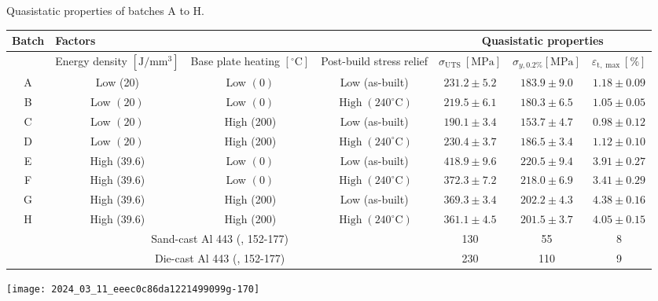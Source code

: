 \documentclass[10pt]{article}
\begin{document}
Quasistatic properties of batches A to H.

\begin{center}
\begin{tabular}{|c|c|c|c|c|c|c|}
\hline
\multirow[t]{2}{*}{Batch} & \multicolumn{3}{|l|}{Factors} & \multicolumn{3}{|c|}{Quasistatic properties} \\
\hline
 & Energy density $\left[\mathrm{J} / \mathrm{mm}^{3}\right]$ & Base plate heating $\left[{ }^{\circ} \mathrm{C}\right]$ & Post-build stress relief & $\sigma_{\text {UTS }}[\mathrm{MPa}]$ & $\sigma_{y, 0.2 \%}[\mathrm{MPa}]$ & $\varepsilon_{\mathrm{t}, \max }[\%]$ \\
\hline
A & Low (20) & Low $(0)$ & Low (as-built) & $231.2 \pm 5.2$ & $183.9 \pm 9.0$ & $1.18 \pm 0.09$ \\
\hline
B & Low $(20)$ & Low $(0)$ & $\operatorname{High}\left(240^{\circ} \mathrm{C}\right)$ & $219.5 \pm 6.1$ & $180.3 \pm 6.5$ & $1.05 \pm 0.05$ \\
\hline
C & Low $(20)$ & High (200) & Low (as-built) & $190.1 \pm 3.4$ & $153.7 \pm 4.7$ & $0.98 \pm 0.12$ \\
\hline
D & Low $(20)$ & High (200) & $\operatorname{High}\left(240^{\circ} \mathrm{C}\right)$ & $230.4 \pm 3.7$ & $186.5 \pm 3.4$ & $1.12 \pm 0.10$ \\
\hline
E & High (39.6) & Low $(0)$ & Low (as-built) & $418.9 \pm 9.6$ & $220.5 \pm 9.4$ & $3.91 \pm 0.27$ \\
\hline
F & High (39.6) & Low $(0)$ & $\operatorname{High}\left(240^{\circ} \mathrm{C}\right)$ & $372.3 \pm 7.2$ & $218.0 \pm 6.9$ & $3.41 \pm 0.29$ \\
\hline
G & High (39.6) & High (200) & Low (as-built) & $369.3 \pm 3.4$ & $202.2 \pm 4.3$ & $4.38 \pm 0.16$ \\
\hline
$\mathrm{H}$ & High (39.6) & High (200) & $\operatorname{High}\left(240^{\circ} \mathrm{C}\right)$ & $361.1 \pm 4.5$ & $201.5 \pm 3.7$ & $4.05 \pm 0.15$ \\
\hline
\multicolumn{4}{|c|}{Sand-cast Al 443 (, 152-177)} & 130 & 55 & 8 \\
\hline
\multicolumn{4}{|c|}{Die-cast Al 443 (, 152-177)} & 230 & 110 & 9 \\
\hline
\end{tabular}
\end{center}

\begin{center}
\texttt{[image: 2024\_03\_11\_eeec0c86da1221499099g-170]}
\end{center}
\end{document}
